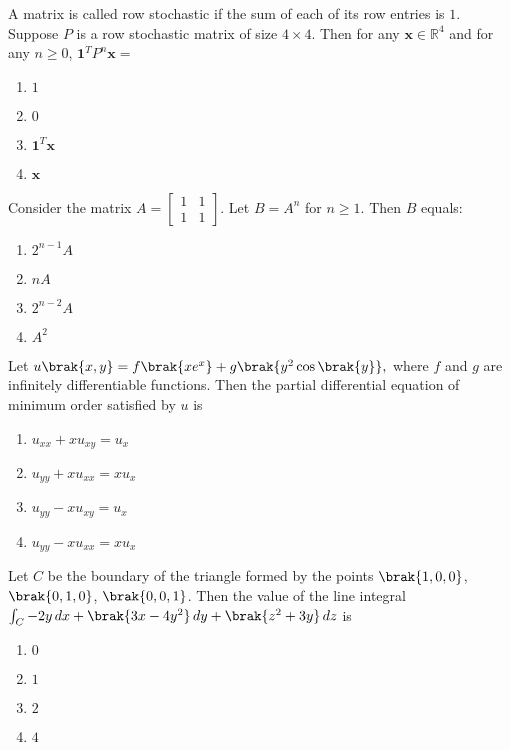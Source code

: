   \item A matrix is called row stochastic if the sum of each of its row entries is $1$. Suppose $P$ is a row stochastic matrix of size $4 \times 4$. Then for any $\mathbf{x} \in \mathbb{R}^4$ and for any $n \geq 0$,
  $
  \mathbf{1}^T P^n \mathbf{x} =
  $
    \begin{enumerate}
      \item $1$
      \item $0$
      \item $\mathbf{1}^T \mathbf{x}$
      \item $\mathbf{x}$
    \end{enumerate}

  \item Consider the matrix $A = \begin{bmatrix}
        1 & 1 \\
        1 & 1
      \end{bmatrix}$. Let $B = A^n$ for $n \geq 1$. Then $B$ equals:
    \begin{enumerate}
      \item $2^{n-1} A$
      \item $nA$
      \item $2^{n-2} A$
      \item $A^2$
    \end{enumerate}

\item Let
  $u\brak{x,y}=f\brak{xe^{x}} + g\brak{y^2\cos\brak{y}},$
  where $f$ and $g$ are infinitely differentiable functions. Then the partial differential
  equation of minimum order satisfied by $u$ is  

  \begin{enumerate}
    \item $u_{xx} + x u_{xy} = u_{x}$
    \item $u_{yy} + x u_{xx} = x u_{x}$
    \item $u_{yy} - x u_{xy} = u_{x}$
    \item $u_{yy} - x u_{xx} = x u_{x}$
  \end{enumerate}

\item Let $C$ be the boundary of the triangle formed by the points $\brak{1,0,0}$, $\brak{0,1,0}$, $\brak{0,0,1}$. Then the value of the line integral
  $
  \int_C -2y\, dx + \brak{3x - 4y^2}\, dy + \brak{z^2 + 3y}\, dz
  $
  is

  \begin{enumerate}
    \item $0$
    \item $1$
    \item $2$
    \item $4$
  \end{enumerate}

